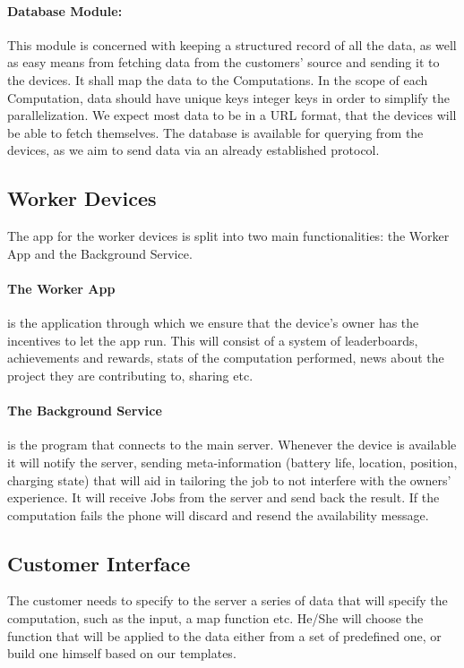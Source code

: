 \documentclass[a4paper,10pt]{article}
\begin{document}
\paragraph{Database Module:}

This module is concerned with keeping a structured record of all the data, as well as easy means from fetching data from the customers' source and sending it to the devices. It shall map the data to the Computations. In the scope of each Computation, data should have unique keys integer keys in order to simplify the parallelization. We expect most data to be in a URL format, that the devices will be able to fetch themselves.
The database is available for querying from the devices, as we aim to send data via an already established protocol. 

\subsection{Worker Devices}
The app for the worker devices is split into two main functionalities: the Worker App and the Background Service. 

\paragraph{The Worker App}
is the application through which we ensure that the device's owner has the incentives to let the app run. This will consist of a system of leaderboards, achievements and rewards, stats of the  computation performed, news about the project they are contributing to, sharing etc.
\paragraph{The Background Service} 
is the program that connects to the main server. Whenever the device is available it will notify the server, sending meta-information (battery life, location, position, charging state) that will aid in tailoring the job to not interfere with the owners' experience. It will receive Jobs from the server and send back the result. If the computation fails the phone will discard and resend the availability message.

\subsection{Customer Interface}
The customer needs to specify to the server a series of data that will specify the computation, such as the input, a map function etc. He/She will choose the function that will be applied to the data either from a set of predefined one, or build one himself based on our templates.
\end{document}
